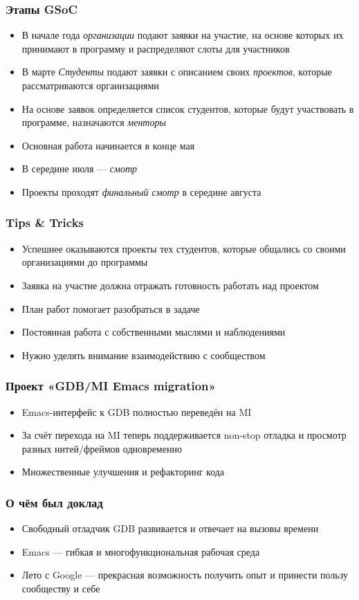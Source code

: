 \documentclass[onlymath]{beamer}
\newcommand\neword\emph
\begin{document}
\begin{frame}
  \frametitle{Этапы GSoC}
  \begin{itemize}
  \item В начале года \neword{организации} подают заявки на участие,
    на основе которых их принимают в программу и распределяют слоты
    для участников
  \item В марте \neword{Студенты} подают заявки с описанием своих
    \neword{проектов}, которые рассматриваются организациями
  \item На основе заявок определяется список студентов, которые будут
    участвовать в программе, назначаются \neword{менторы}
  \item Основная работа начинается в конце мая
  \item В середине июля — \neword{смотр}
  \item Проекты проходят \neword{финальный смотр} в середине августа
  \end{itemize}
\end{frame}

\begin{frame}
  \frametitle{Tips \& Tricks}
  \begin{itemize}
  \item Успешнее оказываются проекты тех студентов, которые общались
    со своими организациями до программы
    
  \item Заявка на участие должна отражать готовность работать над
    проектом

  \item План работ помогает разобраться в задаче
    
  \item Постоянная работа с собственными мыслями и наблюдениями
    
  \item Нужно уделять внимание взаимодействию с сообществом
  \end{itemize}
\end{frame}

\begin{frame}
  \frametitle{Проект «GDB/MI Emacs migration»}
  \begin{itemize}
  \item Emacs-интерфейс к GDB полностью переведён на MI
  \item За счёт перехода на MI теперь поддерживается non-stop отладка
    и просмотр разных нитей/фреймов одновременно
  \item Множественные улучшения и рефакторинг кода
  \end{itemize}
\end{frame}
\appendix
\begin{frame}
  \frametitle{О чём был доклад}
  \begin{itemize}
  \item Свободный отладчик GDB развивается и отвечает на вызовы
    времени
  \item Emacs — гибкая и многофункциональная рабочая среда
  \item Лето с Google — прекрасная возможность получить опыт и
    принести пользу сообществу и себе
  \end{itemize}
\end{frame}
\end{document}
